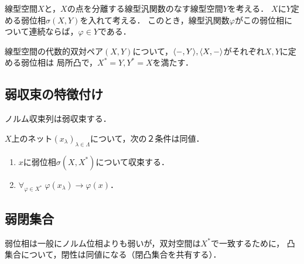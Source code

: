 \documentclass[uplatex,dvipdfmx]{jsreport}
\begin{document}
\begin{proposition}\label{prop-dual-space-of-TVS-with-weak-topology}
    線型空間$X$と，$X$の点を分離する線型汎関数のなす線型空間$Y$を考える．
    $X$に$Y$定める弱位相$\sigma(X,Y)$を入れて考える．
    このとき，線型汎関数$\varphi$がこの弱位相について連続ならば，$\varphi\in Y$である．
\end{proposition}
\begin{corollary}[対称な同値命題]
    線型空間の代数的双対ペア$(X,Y)$について，$\langle-,Y\rangle,\langle X,-\rangle$がそれぞれ$X,Y$に定める弱位相は
    局所凸で，$X^*=Y,Y^*=X$を満たす．
\end{corollary}

\subsection{弱収束の特徴付け}

\begin{tcolorbox}[colframe=ForestGreen, colback=ForestGreen!10!white,breakable,colbacktitle=ForestGreen!40!white,coltitle=black,fonttitle=\bfseries\sffamily,
title=]
    ノルム収束列は弱収束する．
\end{tcolorbox}

\begin{proposition}[弱収束の特徴付け]\label{prop-characterization-of-convergence-in-wtopology}
    $X$上のネット$(x_\lambda)_{\lambda\in\Lambda}$について，次の２条件は同値．
    \begin{enumerate}
        \item $x$に弱位相$\sigma(X,X^*)$について収束する．
        \item $\forall_{\varphi\in X^*}\;\varphi(x_\lambda)\to\varphi(x)$．
    \end{enumerate}
\end{proposition}

\subsection{弱閉集合}

\begin{tcolorbox}[colframe=ForestGreen, colback=ForestGreen!10!white,breakable,colbacktitle=ForestGreen!40!white,coltitle=black,fonttitle=\bfseries\sffamily,
    title=]
    弱位相は一般にノルム位相よりも弱いが，双対空間は$X^*$で一致するために，
    凸集合について，閉性は同値になる（閉凸集合を共有する）．
\end{tcolorbox}
\end{document}

